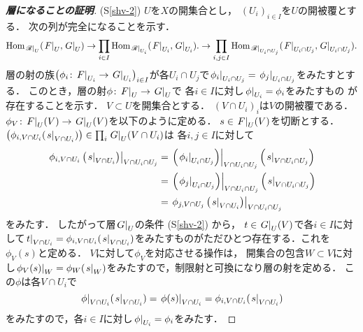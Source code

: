 \begin{proof}[\textbf{層になることの証明}]
    (S\ref{shv-2}) 
    \(U\)を\(X\)の開集合とし，
    \(\left(U_i\right)_{i\in I}\)を\(U\)の開被覆とする．
    次の列が完全になることを示す．
    {\small\[
        \Hom_{\mres[\scR]{U}}(\mres[F]{U},\mres[G]{U})
        \to \prod_{i\in I}\Hom_{\mres[\scR]{U_i}}(\mres[F]{U_i},\mres[G]{U_i}).
        \to \prod_{i, j\in I}\Hom_{\mres[\scR]{U_i\cap U_j}}(\mres[F]{U_i\cap U_j},\mres[G]{U_i\cap U_j}).
    \]}
    層の射の族\(\left(
        \phi_{i}\colon \mres[F]{U_i}\to \mres[G]{U_i}
    \right)_{i\in I}\)が各\(U_{i}\cap U_{j}\)で\(
        \mres[\phi_i]{U_i\cap U_j}=\mres[\phi_j]{U_i\cap U_j}
    \)をみたすとする．
    このとき，層の射\(\phi\colon \mres[F]{U}\to\mres[G]{U}\)で
    各\(i\in I\)に対し\(\mres[\phi]{U_i}=\phi_i\)をみたすもの
    が存在することを示す．
    \(V\subset U\)を開集合とする．
    \((V\cap U_i)_i\)は\(V\)の開被覆である．
    \(\phi_V\colon\mres[F]{U}(V)\to\mres[G]{U}(V)\)を以下のように定める．
    \(s\in\mres[F]{U}(V)\)を切断とする．
    \(\left(
        \phi_{i,V\cap U_i}(\mres[s]{V\cap U_i})
    \right)\in\prod_{i}\mres[G]{U}(V\cap U_i)\)は
    各\(i,j\in I\)に対して
    \begin{align*}
        \mres[{
            \phi_{i,V\cap U_i}\left(\mres[s]{V\cap U_i}\right)
        }]{V\cap U_i\cap U_j}
        &=
        \mres[{
            \left(\mres[\phi_i]{U_i\cap U_j}\right)
        }]{V\cap U_i\cap U_j}\left(\mres[s]{V\cap U_i\cap U_j}\right)\\
        &=
        \mres[{
            \left(\mres[\phi_j]{U_i\cap U_j}\right)
        }]{V\cap U_i\cap U_j}\left(\mres[s]{V\cap U_i\cap U_j}\right)\\
        &=
        \mres[{
            \phi_{j,V\cap U_j}\left(\mres[s]{V\cap U_i}\right)
        }]{V\cap U_i\cap U_j}
    \end{align*}
    をみたす．
    したがって層\(\mres[G]{U}\)の条件 (S\ref{shv-2}) から，
    \(t\in\mres[G]{U}(V)\)で各\(i\in I\)に対して\(
        \mres[t]{V\cap U_i}
        =\phi_{i,V\cap U_i}(\mres[s]{V\cap U_i})
    \)をみたすものがただひとつ存在する．これを\(\phi_V(s)\)と定める．
    \(V\)に対して\(\phi_V\)を対応させる操作は，
    開集合の包含\(W\subset V\)に対し\(
        \mres[\phi_V(s)]{W}=\phi_W(\mres[s]{W})
    \)をみたすので，制限射と可換になり層の射を定める．
    この\(\phi\)は各\(V\cap U_i\)で\[
        \mres[\phi]{V\cap U_i}(\mres[s]{V\cap U_i})
        =\mres[\phi(s)]{V\cap U_i}
        =\phi_{i,V\cap U_i}(\mres[s]{V\cap U_i})
    \]をみたすので，各\(i\in I\)に対し\(
        \mres[\phi]{U_i}=\phi_i
    \)をみたす．
\end{proof}


